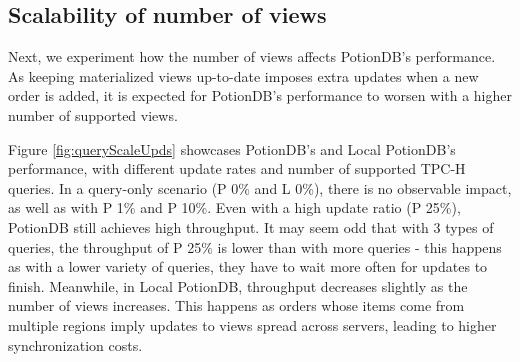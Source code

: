 \documentclass[sigplan,twocolumn,review,anonymous]{acmart}
\begin{document}
\subsection{Scalability of number of views}


Next, we experiment how the number of views affects PotionDB's performance.
As keeping materialized views up-to-date imposes extra updates when a new order is added, it is expected for PotionDB's performance to worsen with a higher number of supported views. %

Figure \ref{fig:queryScaleUpds} showcases PotionDB's and Local PotionDB's performance, with different update rates and number of supported TPC-H queries.
In a query-only scenario (P 0\% and L 0\%), there is no observable impact, as well as with P 1\% and P 10\%. %
Even with a high update ratio (P 25\%), PotionDB still achieves high throughput.
It may seem odd that with 3 types of queries, the throughput of P 25\% is lower than with more queries - this happens as with a lower variety of queries, they have to wait more often for updates to finish. %
Meanwhile, in Local PotionDB, throughput decreases slightly as the number of views increases.
This happens as orders whose items come from multiple regions imply updates to views spread across servers, leading to higher synchronization costs. %
\end{document}
